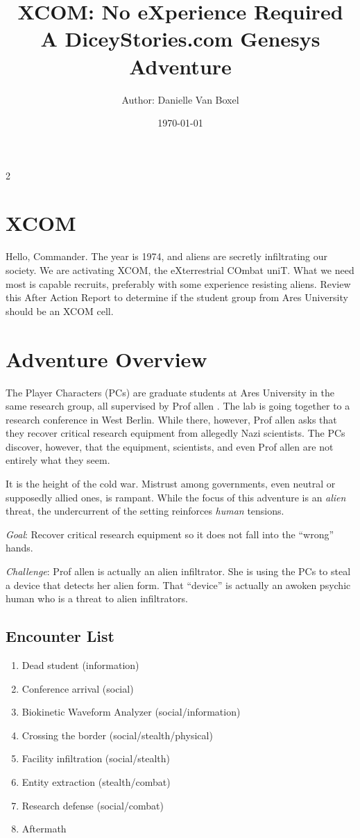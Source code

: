 \documentclass{book}
\title{
    XCOM: No eXperience Required \\
A DiceyStories.com Genesys Adventure\\
}
\author{Author: Danielle Van Boxel}
\date{\today}
\newcommand{\prof}{
    {\color{brown} Prof allen}
}
\begin{document}
\maketitle


\begin{multicols*}{2}
\section{XCOM}

Hello, Commander.  The year is 1974, and aliens are secretly infiltrating our society.  We are activating XCOM, the eXterrestrial COmbat uniT.  What we need most is capable recruits, preferably with some experience resisting aliens.  Review this After Action Report to determine if the student group from Ares University should be an XCOM cell.

\section{Adventure Overview}

    The Player Characters (PCs) are graduate students at Ares University in the same research group, all supervised by \prof.  The lab is going together to a research conference in West Berlin.  While there, however, \prof asks that they recover critical research equipment from allegedly Nazi scientists.  The PCs discover, however, that the equipment, scientists, and even \prof are not entirely what they seem.

It is the height of the cold war.  Mistrust among governments, even neutral or supposedly allied ones, is rampant.  While the focus of this adventure is an \emph{alien} threat, the undercurrent of the setting reinforces \emph{human} tensions.

\emph{Goal}: Recover critical research equipment so it does not fall into the ``wrong'' hands.

\emph{Challenge}: \prof is actually an alien infiltrator.  She is using the PCs to steal a device that detects her alien form.  That ``device'' is actually an awoken psychic human who is a threat to alien infiltrators.

\subsection{Encounter List}
\begin{enumerate}
    \setlength\itemsep{-.8em}
    \item Dead student (information)
    \item Conference arrival (social)
    \item Biokinetic Waveform Analyzer (social/information)
    \item Crossing the border (social/stealth/physical)
    \item Facility infiltration (social/stealth)
    \item Entity extraction (stealth/combat)
    \item Research defense (social/combat)
    \item Aftermath
\end{enumerate}


\end{multicols*}
\end{document}
